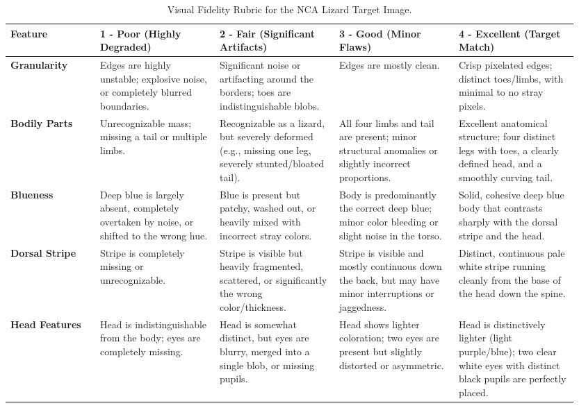 \documentclass{article}
\begin{document}
\begin{table}[H]
    \centering
    \begin{tabular}{| p{0.15\linewidth} | p{0.2\linewidth} | p{0.2\linewidth} | p{0.2\linewidth} | p{0.2\linewidth} |}
        \hline
        \textbf{Feature} & \textbf{1 - Poor (Highly Degraded)} & \textbf{2 - Fair (Significant Artifacts)} & \textbf{3 - Good (Minor Flaws)} & \textbf{4 - Excellent (Target Match)} \\ \hline
        
        \textbf{Granularity} & 
        Edges are highly unstable; explosive noise, or completely blurred boundaries. & 
        Significant noise or artifacting around the borders; toes are indistinguishable blobs. & 
        Edges are mostly clean. & 
        Crisp pixelated edges; distinct toes/limbs, with minimal to no stray pixels. \\ \hline
        
        \textbf{Bodily Parts} & 
        Unrecognizable mass; missing a tail or multiple limbs. & 
        Recognizable as a lizard, but severely deformed (e.g., missing one leg, severely stunted/bloated tail). & 
        All four limbs and tail are present; minor structural anomalies or slightly incorrect proportions. & 
        Excellent anatomical structure; four distinct legs with toes, a clearly defined head, and a smoothly curving tail. \\ \hline
        
        \textbf{Blueness} & 
        Deep blue is largely absent, completely overtaken by noise, or shifted to the wrong hue. & 
        Blue is present but patchy, washed out, or heavily mixed with incorrect stray colors. & 
        Body is predominantly the correct deep blue; minor color bleeding or slight noise in the torso. & 
        Solid, cohesive deep blue body that contrasts sharply with the dorsal stripe and the head. \\ \hline
        
        \textbf{Dorsal Stripe} & 
        Stripe is completely missing or unrecognizable. & 
        Stripe is visible but heavily fragmented, scattered, or significantly the wrong color/thickness. & 
        Stripe is visible and mostly continuous down the back, but may have minor interruptions or jaggedness. & 
        Distinct, continuous pale white stripe running cleanly from the base of the head down the spine. \\ \hline
        
        \textbf{Head Features} & 
        Head is indistinguishable from the body; eyes are completely missing. & 
        Head is somewhat distinct, but eyes are blurry, merged into a single blob, or missing pupils. & 
        Head shows lighter coloration; two eyes are present but slightly distorted or asymmetric. & 
        Head is distinctively lighter (light purple/blue); two clear white eyes with distinct black pupils are perfectly placed. \\ \hline
    \end{tabular}
    \caption{Visual Fidelity Rubric for the NCA Lizard Target Image.}
    \label{tab:visual-rubric}
\end{table}
\end{document}
